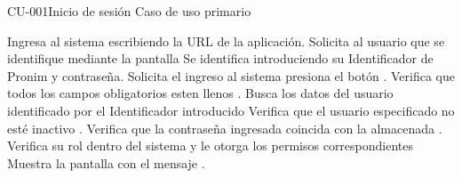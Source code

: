 \begin{UseCase}{CU-001}{Inicio de sesión}
{		%
		Caso de uso primario
	}
\end{UseCase}

\begin{UCtrayectoria}
	
	\UCpaso[\UCactor] Ingresa al sistema escribiendo la URL de la aplicación.
	\UCpaso Solicita al usuario que se identifique mediante la pantalla 
	\UCpaso[\UCactor] \label{UC1.Datos} Se identifica introduciendo su Identificador de Pronim y contraseña.
	\UCpaso[\UCactor] Solicita el ingreso al sistema presiona el botón .
    \UCpaso Verifica que todos los campos obligatorios esten llenos .
	\UCpaso Busca los datos del usuario identificado por el Identificador introducido 
	\UCpaso Verifica que el usuario especificado no esté inactivo .
	\UCpaso Verifica que la contraseña ingresada coincida con la almacenada .\label{UC1.Contrasenia}
	\UCpaso Verifica su rol dentro del sistema y le otorga los permisos correspondientes
	\UCpaso Muestra la pantalla  con el mensaje .
\end{UCtrayectoria}


